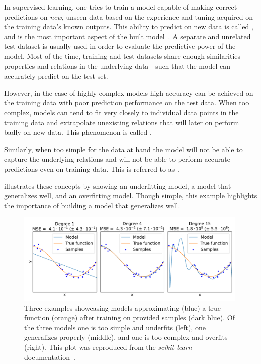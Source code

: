 In supervised learning, one tries to train a model capable of making correct predictions on \textit{new}, unseen data based on the experience and tuning acquired on the training data's known outputs.
This ability to predict on new data is called , and is the most important aspect of the built model~\cite{PR:Rosenblatt:Perceptron,BOOK:Bishop:Neural_Networks_Pattern_Recognition}.
A separate and unrelated test dataset is usually used in order to evaluate the predictive power of the model.
Most of the time, training and test datasets share enough similarities - properties and relations in the underlying data - such that the model can accurately predict on the test set.

However, in the case of highly complex models high accuracy can be achieved on the training data with poor prediction performance on the test data.
When too complex, models can tend to fit very closely to individual data points in the training data and extrapolate unexisting relations that will later on perform badly on new data.
This phenomenon is called .

Similarly, when too simple for the data at hand the model will not be able to capture the underlying relations and will not be able to perform accurate predictions even on training data.
This is referred to as .

 illustrates these concepts by showing an underfitting model, a model that generalizes well, and an overfitting model.
Though simple, this example highlights the importance of building a model that generalizes well.

\begin{figure}[!htb]
    \centering
    \includegraphics*[width=0.99\textwidth]{Figures/ML_for_IR_Coupling/ml_underfitting_overfitting.pdf}
    \caption{Three examples showcasing models approximating (\textcolor{mplblue}{blue}) a true function (\textcolor{mplorange}{orange}) after training on provided samples (\textcolor{mplb}{dark blue}). Of the three models one is too simple and underfits (left), one generalizes properly (middle), and one is too complex and overfits (right). This plot was reproduced from the \textit{scikit-learn} documentation~\cite{CODE:scikit-learn, Website:ScikitLearn:Overfitting_Example}.}
    \label{figure:ml_underfitting_overfitting}
\end{figure}


